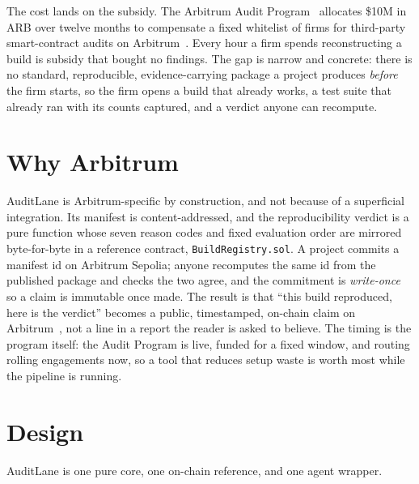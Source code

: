 \documentclass[11pt]{article}
\begin{document}
The cost lands on the subsidy. The Arbitrum Audit Program~\cite{arbaudit} allocates
\$10M in ARB over twelve months to compensate a fixed whitelist of firms for third-party
smart-contract audits on Arbitrum~\cite{arbitrum}. Every hour a firm spends reconstructing
a build is subsidy that bought no findings. The gap is narrow and concrete: there is no
standard, reproducible, evidence-carrying package a project produces \emph{before} the firm
starts, so the firm opens a build that already works, a test suite that already ran with
its counts captured, and a verdict anyone can recompute.

\section{Why Arbitrum}
AuditLane is Arbitrum-specific by construction, and not because of a superficial
integration. Its manifest is content-addressed, and the reproducibility verdict is a pure
function whose seven reason codes and fixed evaluation order are mirrored byte-for-byte in
a reference contract, \texttt{BuildRegistry.sol}. A project commits a manifest id on
Arbitrum Sepolia; anyone recomputes the same id from the published package and checks the
two agree, and the commitment is \emph{write-once} so a claim is immutable once made. The
result is that ``this build reproduced, here is the verdict'' becomes a public, timestamped,
on-chain claim on Arbitrum~\cite{arbdocs}, not a line in a report the reader is asked to
believe. The timing is the program itself: the Audit Program is live, funded for a fixed
window, and routing rolling engagements now, so a tool that reduces setup waste is worth
most while the pipeline is running.

\section{Design}
AuditLane is one pure core, one on-chain reference, and one agent wrapper.
\end{document}
